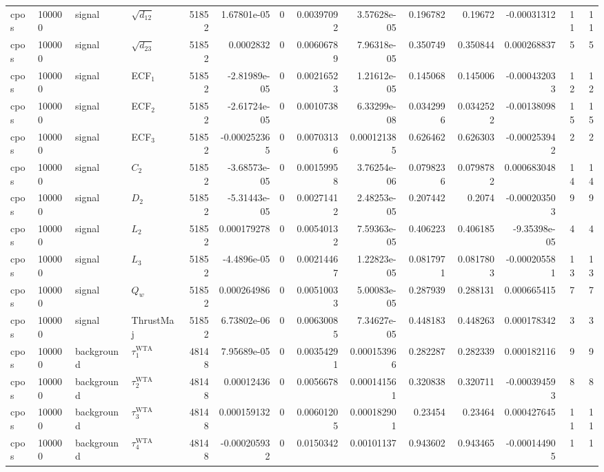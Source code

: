 \begin{landscape}
\begin{longtable}{llll r rrrr rr r rr}
cpos & 100000 & signal & $\sqrt{d_{12}}$ & 51852 & 1.67801e-05 & 0 & 0.00397092 & 3.57628e-05 & 0.196782 & 0.19672 & -0.00031312 & 11 & 11 \\
cpos & 100000 & signal & $\sqrt{d_{23}}$ & 51852 & 0.0002832 & 0 & 0.00606789 & 7.96318e-05 & 0.350749 & 0.350844 & 0.000268837 & 5 & 5 \\
cpos & 100000 & signal & ECF$_1$ & 51852 & -2.81989e-05 & 0 & 0.00216523 & 1.21612e-05 & 0.145068 & 0.145006 & -0.000432033 & 12 & 12 \\
cpos & 100000 & signal & ECF$_2$ & 51852 & -2.61724e-05 & 0 & 0.0010738 & 6.33299e-08 & 0.0342996 & 0.0342522 & -0.00138098 & 15 & 15 \\
cpos & 100000 & signal & ECF$_3$ & 51852 & -0.000252365 & 0 & 0.00703136 & 0.000121385 & 0.626462 & 0.626303 & -0.000253942 & 2 & 2 \\
cpos & 100000 & signal & $C_2$ & 51852 & -3.68573e-05 & 0 & 0.00159958 & 3.76254e-06 & 0.0798236 & 0.0798782 & 0.000683048 & 14 & 14 \\
cpos & 100000 & signal & $D_2$ & 51852 & -5.31443e-05 & 0 & 0.00271412 & 2.48253e-05 & 0.207442 & 0.2074 & -0.000203503 & 9 & 9 \\
cpos & 100000 & signal & $L_2$ & 51852 & 0.000179278 & 0 & 0.00540132 & 7.59363e-05 & 0.406223 & 0.406185 & -9.35398e-05 & 4 & 4 \\
cpos & 100000 & signal & $L_3$ & 51852 & -4.4896e-05 & 0 & 0.00214467 & 1.22823e-05 & 0.0817971 & 0.0817803 & -0.000205581 & 13 & 13 \\
cpos & 100000 & signal & $Q_w$ & 51852 & 0.000264986 & 0 & 0.00510033 & 5.00083e-05 & 0.287939 & 0.288131 & 0.000665415 & 7 & 7 \\
cpos & 100000 & signal & ThrustMaj & 51852 & 6.73802e-06 & 0 & 0.00630085 & 7.34627e-05 & 0.448183 & 0.448263 & 0.000178342 & 3 & 3 \\
cpos & 100000 & background & $\tau_1^{\mathrm{WTA}}$ & 48148 & 7.95689e-05 & 0 & 0.00354291 & 0.000153966 & 0.282287 & 0.282339 & 0.000182116 & 9 & 9 \\
cpos & 100000 & background & $\tau_2^{\mathrm{WTA}}$ & 48148 & 0.00012436 & 0 & 0.0056678 & 0.000141561 & 0.320838 & 0.320711 & -0.000394593 & 8 & 8 \\
cpos & 100000 & background & $\tau_3^{\mathrm{WTA}}$ & 48148 & 0.000159132 & 0 & 0.00601205 & 0.000182901 & 0.23454 & 0.23464 & 0.000427645 & 11 & 11 \\
cpos & 100000 & background & $\tau_4^{\mathrm{WTA}}$ & 48148 & -0.000205932 & 0 & 0.0150342 & 0.00101137 & 0.943602 & 0.943465 & -0.000144905 & 1 & 1 \\

\end{longtable}
\end{landscape}
